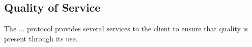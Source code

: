 \subsection{Quality of Service}
\label{sec:pdus:qos}

The ... protocol provides several services to the client to ensure that quality is present through its use. 
